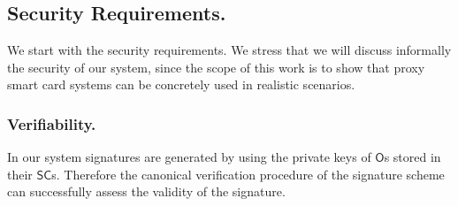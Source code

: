 \documentclass[preprint,authoryear,12pt]{elsarticle}
\newcommand{\Owner}{\ensuremath{\mathsf{O}}}
\newcommand{\SC}{\ensuremath{\mathsf{SC}}}
\begin{document}
\subsection{Security Requirements.}
We start with the security requirements. We stress that we will discuss informally the security of our system, since the scope of this work is to show that proxy smart card systems can be concretely used in realistic scenarios. 

\subsubsection{Verifiability.}  In our system signatures are generated by using the private keys of \Owner s stored in their \SC s. Therefore the canonical verification procedure of the signature scheme can successfully assess the validity of the signature.
\end{document}
